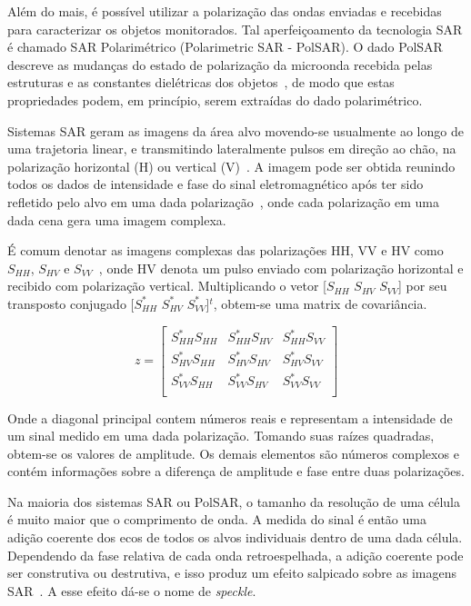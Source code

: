 \documentclass[12pt]{article}
\begin{document}
Além do mais, é possível utilizar a polarização das ondas enviadas e recebidas para caracterizar os objetos monitorados. Tal aperfeiçoamento da tecnologia SAR é chamado SAR Polarimétrico (Polarimetric SAR - PolSAR). O dado PolSAR descreve as mudanças do estado de polarização da microonda recebida pelas estruturas e as constantes dielétricas dos objetos~\cite{Ouchi13}, de modo que estas propriedades podem, em princípio, serem extraídas do dado polarimétrico. 

Sistemas SAR geram as imagens da área alvo movendo-se usualmente ao longo de uma trajetoria linear, e transmitindo lateralmente pulsos em direção ao chão, na polarização horizontal (H) ou vertical (V)~\cite{Richards09}. A imagem pode ser obtida reunindo todos os dados de intensidade e fase do sinal eletromagnético após ter sido refletido pelo alvo em uma dada polarização~\cite{Pottier09}, onde cada polarização em uma dada cena gera uma imagem complexa.

É comum denotar as imagens complexas das polarizações HH, VV e HV como $S_{HH}$, $S_{HV}$ e $S_{VV}$~\cite{Frery15}, onde HV denota um pulso enviado com polarização horizontal e recibido com polarização vertical. Multiplicando o vetor [$S_{HH}$  $S_{HV}$ $S_{VV}$] por seu transposto conjugado [$S_{HH}^*$  $S_{HV}^*$ $S_{VV}^*$]$^t$, obtem-se uma matrix de covariância.

\[
z = 
\begin{bmatrix}
	S_{HH}^*S_{HH} & S_{HH}^*S_{HV} & S_{HH}^*S_{VV}\\
    S_{HV}^*S_{HH} & S_{HV}^*S_{HV} & S_{HV}^*S_{VV}\\
    S_{VV}^*S_{HH} & S_{VV}^*S_{HV} & S_{VV}^*S_{VV}\\
\end{bmatrix}
\]

Onde a diagonal principal contem números reais e representam a intensidade de um sinal medido em uma dada polarização. Tomando suas raízes quadradas, obtem-se os valores de amplitude. Os demais elementos são números complexos e contém informações sobre a diferença de amplitude e fase entre duas polarizações.

Na maioria dos sistemas SAR ou PolSAR, o tamanho da resolução de uma célula é muito maior que o comprimento de onda. A medida  do sinal é então uma adição coerente dos ecos de todos os alvos individuais dentro de uma dada célula. Dependendo da fase relativa de cada onda retroespelhada, a adição coerente pode ser construtiva ou destrutiva, e isso produz um efeito salpicado sobre as imagens SAR~\cite{Goodman76}. A esse efeito dá-se o nome de \textit{speckle}.
\end{document}
